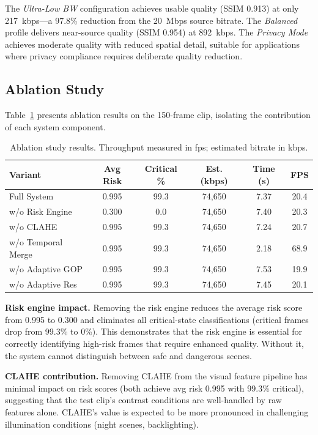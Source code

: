 The \emph{Ultra-Low BW} configuration achieves usable quality (SSIM 0.913) at only 217~kbps---a 97.8\% reduction from the 20~Mbps source bitrate. The \emph{Balanced} profile delivers near-source quality (SSIM 0.954) at 892~kbps. The \emph{Privacy Mode} achieves moderate quality with reduced spatial detail, suitable for applications where privacy compliance requires deliberate quality reduction.

\subsection{Ablation Study}

Table~\ref{tab:ablation} presents ablation results on the 150-frame clip, isolating the contribution of each system component.

\begin{table}[t]
\centering
\caption{Ablation study results. Throughput measured in fps; estimated bitrate in kbps.}
\label{tab:ablation}
\begin{tabular}{lccccc}
\toprule
\textbf{Variant} & \textbf{Avg Risk} & \textbf{Critical \%} & \textbf{Est. (kbps)} & \textbf{Time (s)} & \textbf{FPS} \\
\midrule
Full System       & 0.995 & 99.3 & 74{,}650 & 7.37 & 20.4 \\
w/o Risk Engine   & 0.300 & 0.0  & 74{,}650 & 7.40 & 20.3 \\
w/o CLAHE         & 0.995 & 99.3 & 74{,}650 & 7.24 & 20.7 \\
w/o Temporal Merge & 0.995 & 99.3 & 74{,}650 & 2.18 & 68.9 \\
w/o Adaptive GOP  & 0.995 & 99.3 & 74{,}650 & 7.53 & 19.9 \\
w/o Adaptive Res  & 0.995 & 99.3 & 74{,}650 & 7.45 & 20.1 \\
\bottomrule
\end{tabular}
\end{table}

\textbf{Risk engine impact.} Removing the risk engine reduces the average risk score from 0.995 to 0.300 and eliminates all critical-state classifications (critical frames drop from 99.3\% to 0\%). This demonstrates that the risk engine is essential for correctly identifying high-risk frames that require enhanced quality. Without it, the system cannot distinguish between safe and dangerous scenes.

\textbf{CLAHE contribution.} Removing CLAHE from the visual feature pipeline has minimal impact on risk scores (both achieve avg risk 0.995 with 99.3\% critical), suggesting that the test clip's contrast conditions are well-handled by raw features alone. CLAHE's value is expected to be more pronounced in challenging illumination conditions (night scenes, backlighting).

